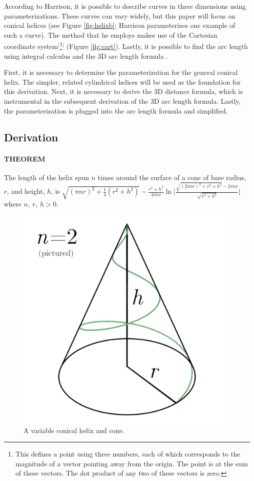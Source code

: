 \documentclass{article}
\begin{document}
According to Harrison, it is possible to describe curves in three dimensions using parameterizations. These curves can vary widely, but this paper will focus on conical helices (see Figure \ref{fig:helixb}; Harrison parameterizes one example of such a curve). The method that he employs makes use of the Cartesian coordinate system$^[$\footnote{This defines a point using three numbers, each of which corresponds to the magnitude of a vector pointing away from the origin. The point is at the sum of these vectors. The dot product of any two of these vectors is zero.}$^]$ (Figure \ref{fig:cart}). Lastly, it is possible to find the arc length using integral calculus and the 3D arc length formula \cite{Bib:param}.\par
First, it is necessary to determine the parameterization for the general conical helix. The simpler, related cylindrical helices will be used as the foundation for this derivation. Next, it is necessary to derive the 3D distance formula, which is instrumental in the subsequent derivation of the 3D arc length formula. Lastly, the parameterization is plugged into the arc length formula and simplified.


\subsection{Derivation}
\paragraph{THEOREM} The length of the helix spun $n$ times around the surface of a cone of base radius, $r$, and height, $h$, is $\sqrt{(\pi nr)^2+\frac{1}{4}\left(r^2+h^2\right)}-\frac{r^2+h^2}{4\pi nr}\ln\bigg|\frac{\sqrt{(2\pi nr)^2+r^2+h^2}-2\pi nr}{\sqrt{r^2+h^2}}\bigg|$ where $n,\ r,\ h>0$.

\begin{figure}[h!]
    \centering
    \includegraphics[width=0.4\linewidth]{Blender/helixlab.png}
    \caption{A variable conical helix and cone.}
    \label{fig:helixlab}
\end{figure}
\end{document}

